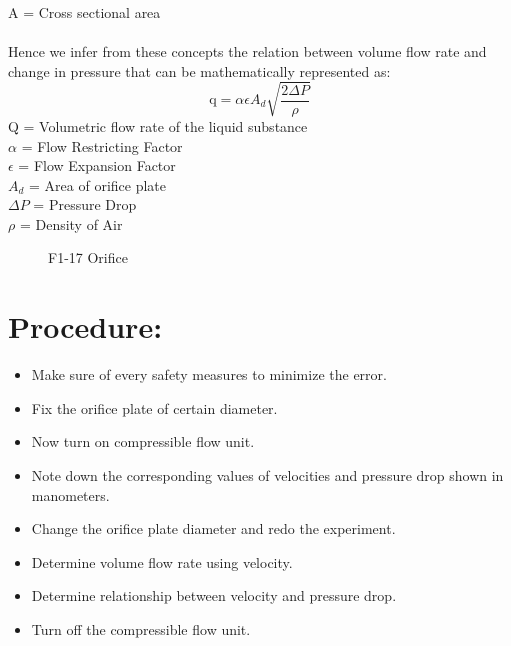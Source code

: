 \documentclass[12pt,a4paper]{article}
\begin{document}
A = Cross sectional area\\
\\ Hence we infer from these concepts the relation between volume flow rate and change in pressure that can be mathematically represented as:
\begin{equation}
	\text{q} = \text{$\alpha \epsilon A_d$} \sqrt{\frac{\text{$2 \Delta P$}}{\text{$\rho$}}}
\end{equation}
Q = Volumetric flow rate of the liquid substance\\
$\alpha$ = Flow Restricting Factor\\
$\epsilon$ = Flow Expansion Factor\\
$A_d$ = Area of orifice plate\\
$\Delta P$ = Pressure Drop\\
$\rho$ = Density of Air\\
\clearpage
\begin{figure}[!ht]
	\begin{center}
	\end{center}
	\caption{F1-17 Orifice}
\end{figure}
\section{Procedure:}
\begin{itemize}
\item Make sure of every safety measures to minimize the error.
\item Fix the orifice plate of certain diameter.
\item Now turn on compressible flow unit.
\item Note down the corresponding values of velocities and pressure drop shown in manometers.
\item Change the orifice plate diameter and redo the experiment.
\item Determine volume flow rate using velocity.
\item Determine relationship between velocity and pressure drop.
\item Turn off the compressible flow unit.
\end{itemize}
\end{document}
